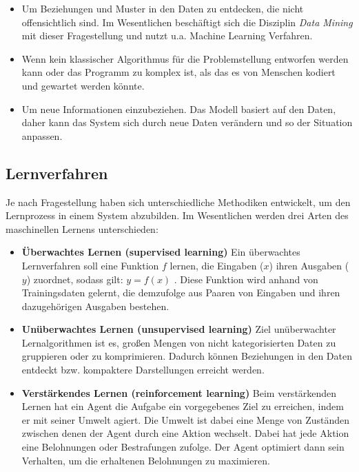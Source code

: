 \begin{itemize}
	\item Um Beziehungen und Muster in den Daten zu entdecken, die nicht offensichtlich sind. Im Wesentlichen beschäftigt sich die Disziplin \textit{Data Mining} mit dieser Fragestellung und nutzt u.a. Machine Learning Verfahren.
	\item Wenn kein klassischer Algorithmus für die Problemstellung entworfen werden kann oder das Programm zu komplex ist, als das es von Menschen kodiert und gewartet werden könnte.
	\item Um neue Informationen einzubeziehen. Das Modell basiert auf den Daten, daher kann das System sich durch neue Daten verändern und so der Situation anpassen.
\end{itemize}

\subsection{Lernverfahren}

Je nach Fragestellung haben sich unterschiedliche Methodiken entwickelt, um den Lernprozess in einem System abzubilden. Im Wesentlichen werden drei Arten des maschinellen Lernens unterschieden:

\begin{itemize}
	\item \textbf{Überwachtes Lernen (supervised learning)} Ein überwachtes Lernverfahren soll eine Funktion $f$ lernen, die Eingaben ($x$) ihren Ausgaben ($y$) zuordnet, sodass gilt: $y = f(x)$ . Diese Funktion wird anhand von Trainingsdaten gelernt, die demzufolge aus Paaren von Eingaben und ihren dazugehörigen Ausgaben bestehen.
	\item \textbf{Unüberwachtes Lernen (unsupervised learning)} Ziel unüberwachter Lernalgorithmen ist es, großen Mengen von nicht kategorisierten Daten zu gruppieren oder zu komprimieren. Dadurch können Beziehungen in den Daten entdeckt bzw. kompaktere Darstellungen erreicht werden.
	\item \textbf{Verstärkendes Lernen (reinforcement learning)} Beim verstärkenden Lernen hat ein Agent die Aufgabe ein vorgegebenes Ziel zu erreichen, indem er mit seiner Umwelt agiert. Die Umwelt ist dabei eine Menge von Zuständen zwischen denen der Agent durch eine Aktion wechselt. Dabei hat jede Aktion eine Belohnungen oder Bestrafungen zufolge. Der Agent optimiert dann sein Verhalten, um die erhaltenen Belohnungen zu maximieren.
\end{itemize}

